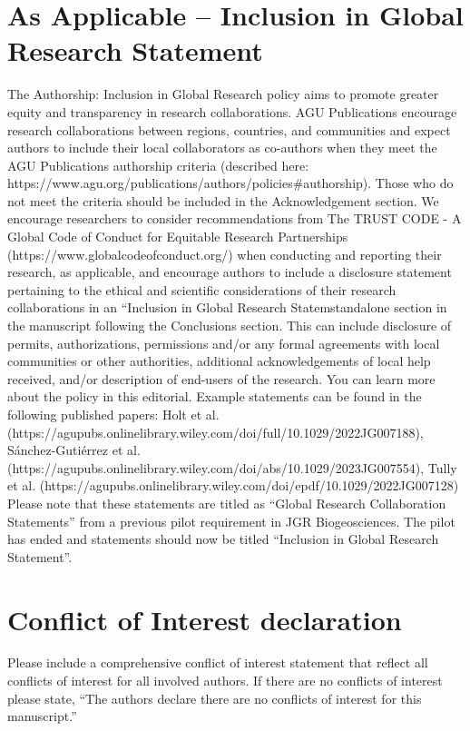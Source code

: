 \documentclass[draft]{agujournal2019}
\begin{document}
\begin{refsection}
\section*{As Applicable – Inclusion in Global Research Statement}
The Authorship: Inclusion in Global Research policy aims to promote greater equity and transparency in research collaborations. AGU Publications encourage research collaborations between regions, countries, and communities and expect authors to include their local collaborators as co-authors when they meet the AGU Publications authorship criteria (described here: https://www.agu.org/publications/authors/policies\#authorship). Those who do not meet the criteria should be included in the Acknowledgement section. We encourage researchers to consider recommendations from The TRUST CODE - A Global Code of Conduct for Equitable Research Partnerships (https://www.globalcodeofconduct.org/) when conducting and reporting their research, as applicable, and encourage authors to include a disclosure statement pertaining to the ethical and scientific considerations of their research collaborations in an “Inclusion in Global Research Statemstandalone section in the manuscript following the Conclusions section. This can include disclosure of permits, authorizations, permissions and/or any formal agreements with local communities or other authorities, additional acknowledgements of local help received, and/or description of end-users of the research. You can learn more about the policy in this editorial. Example statements can be found in the following published papers: 
Holt et al. (https://agupubs.onlinelibrary.wiley.com/doi/full/10.1029/2022JG007188), 
Sánchez-Gutiérrez et al. (https://agupubs.onlinelibrary.wiley.com/doi/abs/10.1029/2023JG007554), 
Tully et al. (https://agupubs.onlinelibrary.wiley.com/doi/epdf/10.1029/2022JG007128) 
Please note that these statements are titled as “Global Research Collaboration Statements” from a previous pilot requirement in JGR Biogeosciences. The pilot has ended and statements should now be titled “Inclusion in Global Research Statement”.

\section*{Conflict of Interest declaration}
Please include a comprehensive conflict of interest statement that reflect all conflicts of interest for all involved authors. If there are no conflicts of interest please state, “The authors declare there are no conflicts of interest for this manuscript.”




\end{refsection}
\end{document}

